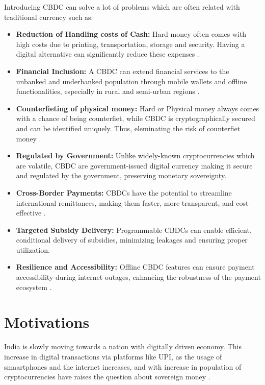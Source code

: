 Introducing CBDC can solve a lot of problems which are often related with traditional currency such as:
\begin{itemize}

    \item \textbf{Reduction of Handling costs of Cash:} Hard money often comes with high costs due to printing, transportation, storage and security. Having a digital alternative can significantly reduce these expenses \cite{klein2020}.

    \item \textbf{Financial Inclusion:} A CBDC can extend financial services to the unbanked and underbanked population through mobile wallets and offline functionalities, especially in rural and semi-urban regions \cite{catalini2021,agarwal2021}.

    \item \textbf{Counterfieting of physical money:} Hard or Physical money always comes with a chance of being counterfiet, while CBDC is cryptographically secured and can be identified uniquely. Thus, eleminating the risk of counterfiet money \cite{rbi2023}.

    \item \textbf{Regulated by Government:} Unlike widely-known cryptocurrencies which are volatile, CBDC are government-issued digital currency making it secure and regulated by the government, preserving monetary sovereignty.

    \item \textbf{Cross-Border Payments:} CBDCs have the potential to streamline international remittances, making them faster, more transparent, and cost-effective \cite{bis2021}.

    \item \textbf{Targeted Subsidy Delivery:} Programmable CBDCs can enable efficient, conditional delivery of subsidies, minimizing leakages and ensuring proper utilization.

    \item \textbf{Resilience and Accessibility:} Offline CBDC features can ensure payment accessibility during internet outages, enhancing the robustness of the payment ecosystem \cite{auer2020}.
\end{itemize}



\section{Motivations}
India is slowly moving towards a nation with digitally driven economy. This increase in digital transactions via platforms like UPI, as the usage of smaartphones and the internet increases, and with increase in population of cryptocurrencies have raises the question about sovereign money \cite{barontini2020}.

